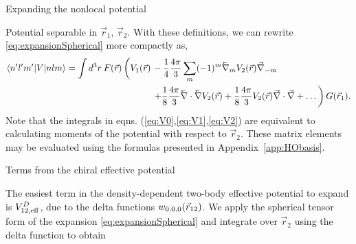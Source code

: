 \begin{section}{Expanding the nonlocal potential}
\begin{subsection}{Potential separable in $\vec{r}_1$, $\vec{r}_2$.\label{subsec:form1}}
With these definitions, we can rewrite \eqref{eq:expansionSpherical} more compactly as,
\begin{equation}\label{eq:expansion2}
\begin{split}
\braket{n' l' m'| V | n l m} =  \int d^3r\: F(\vec{r})\left( \vphantom{\frac{1}{2}}V_1(\vec{r})\right.&-\frac{1}{4}\frac{4\pi}{3}\sum_m(-1)^m \lvec{\nabla}_{m}  V_2(\vec{r}) \vec{\nabla}_{-m} \\
&\left.+\frac{1}{8}\frac{4\pi}{3}\lvec{\nabla}\cdot\lvec{\nabla} V_2(\vec{r})+\frac{1}{8}\frac{4\pi}{3}V_2(\vec{r})\vec{\nabla}\cdot\vec{\nabla}+\dots\right) G(\vec{r}_1).
\end{split}
\end{equation}
Note that the integrals in eqns. (\ref{eq:V0},\ref{eq:V1},\ref{eq:V2})  are equivalent to calculating moments of the potential with respect to $\vec{r}_2$. These matrix elements may be evaluated using the formulas presented in Appendix~\ref{app:HObasis}.

\end{subsection}

\begin{subsection}{Terms from the chiral effective potential}

The easiest term in the density-dependent two-body effective potential to expand is $V_{12,\text{eff}}^D$, due to the delta functions $w_{0,0,0}(\vec{r}_{12})$. We apply the spherical tensor form of the expansion \eqref{eq:expansionSpherical} and integrate over $\vec{r}_2$ using the delta function to obtain


\end{subsection}
\end{section}
